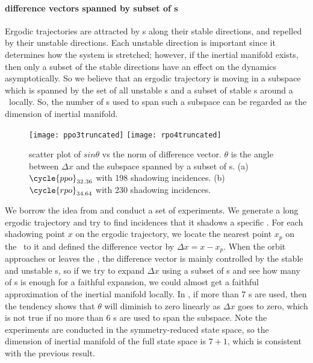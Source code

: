 \paragraph{difference vectors spanned by subset of \Fv s}
Ergodic trajectories are attracted by \po s along their stable directions,
and repelled by their unstable directions. Each unstable direction is
important since it determines how the system is stretched; however, if the
inertial manifold exists, then only a subset of the stable directions
have an effect on the dynamics asymptotically. So we believe that an ergodic
trajectory is moving in a subspace which is spanned by the set of
all unstable \Fv s and a subset of stable \Fv s around a \po\ locally.
So, the number of \Fv s used to span such a subspace can be regarded
as the dimension of inertial manifold.
\begin{figure}[h]
  \centering
  \texttt{[image: ppo3truncated]} \hfill
  \texttt{[image: rpo4truncated]}
  \caption{
    scatter plot of $sin\theta$ vs the norm of difference vector.
    $\theta$ is the angle between $\Delta x$ and the subspace spanned
    by a subset of \Fv s.
    (a) $\cycle{ppo}_{32.36}$ with 198 shadowing incidences.
    (b) $\cycle{rpo}_{34.64}$ with 230 shadowing incidences.
  }
  \label{fig:angApproach}
\end{figure}

We borrow the idea from and conduct a set of experiments.
We generate a long ergodic trajectory and try to find incidences that it shadows
a specific \po. For each shadowing point $x$ on the ergodic trajectory,
we locate the nearest point $x_p$ on the \po\ to it and defined the
difference vector by $\Delta x = x - x_p$. When the orbit approaches or leaves the
\po, the difference vector is mainly controlled by the stable and unstable \Fv s,
so if we try to expand $\Delta x$ using a subset of \Fv s and see
how many of \Fv s is enough for a faithful expansion, we could almost get a
faithful approximation of the inertial manifold locally. In
, if more than 7 \Fv s are used, then the
tendency shows that $\theta$ will
diminish to zero linearly as $\Delta x$ goes to zero, which is not true
if no more than 6 \Fv s are used to span the subspace. Note the experiments are
conducted in the symmetry-reduced state space, so the dimension of inertial
manifold of the full state space is $7+1$, which is consistent with the previous
result.

